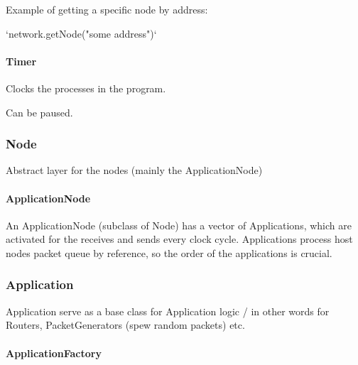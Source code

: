 Example of getting a specific node by address\+: \begin{DoxyVerb}`network.getNode("some address")`
\end{DoxyVerb}


\paragraph*{Timer}


\begin{DoxyItemize}
\item Clocks the processes in the program.
\item Can be paused.
\end{DoxyItemize}

\subsubsection*{Node}


\begin{DoxyItemize}
\item Abstract layer for the nodes (mainly the Application\+Node)
\end{DoxyItemize}

\paragraph*{Application\+Node}


\begin{DoxyItemize}
\item An Application\+Node (subclass of Node) has a vector of Applications, which are activated for the receives and sends every clock cycle. Applications process host node\textquotesingle{}s packet queue by reference, so the order of the applications is crucial.
\end{DoxyItemize}

\subsubsection*{Application}


\begin{DoxyItemize}
\item Application serve as a base class for Application logic / in other words for Routers, Packet\+Generators (spew random packets) etc.
\end{DoxyItemize}

\paragraph*{Application\+Factory}


